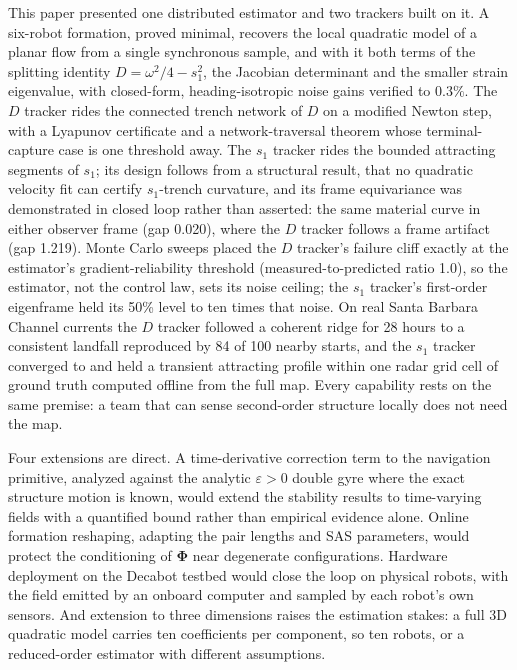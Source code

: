 \documentclass[lettersize,journal]{IEEEtran}
\begin{document}
This paper presented one distributed estimator and two trackers built
on it. A six-robot formation, proved minimal, recovers the local
quadratic model of a planar flow from a single synchronous sample, and
with it both terms of the splitting identity $D = \omega^2/4 - s_1^2$,
the Jacobian determinant and the smaller strain eigenvalue, with
closed-form, heading-isotropic noise gains verified to $0.3\%$. The
$D$ tracker rides the connected trench network of $D$ on a
modified Newton step, with a Lyapunov certificate and a
network-traversal theorem whose terminal-capture case is one threshold
away. The $s_1$ tracker rides the bounded attracting segments of $s_1$;
its design follows from a structural result, that no quadratic velocity
fit can certify $s_1$-trench curvature, and its frame equivariance was
demonstrated in closed loop rather than asserted: the same material
curve in either observer frame (gap 0.020), where the $D$ tracker
follows a frame artifact (gap 1.219). Monte Carlo sweeps placed the
$D$ tracker's failure cliff exactly at the estimator's
gradient-reliability threshold (measured-to-predicted ratio 1.0), so
the estimator, not the control law, sets its noise ceiling; the $s_1$
tracker's first-order eigenframe held its 50\% level to ten times that
noise. On real Santa
Barbara Channel currents the $D$ tracker followed a coherent
ridge for 28 hours to a consistent landfall reproduced by 84 of 100
nearby starts, and the $s_1$ tracker converged to and held a transient
attracting profile within one radar grid cell of ground truth computed
offline from the full map. Every capability rests on the same premise:
a team that can sense second-order structure locally does not need the
map.

Four extensions are direct. A time-derivative correction term to the
navigation primitive, analyzed against the analytic $\varepsilon > 0$
double gyre where the exact structure motion is known, would extend
the stability results to time-varying fields with a quantified bound
rather than empirical evidence alone. Online formation reshaping,
adapting the pair lengths and SAS parameters, would protect the
conditioning of $\boldsymbol{\Phi}$ near degenerate configurations.
Hardware deployment on the Decabot testbed would close the loop on
physical robots, with the field emitted by an onboard computer and
sampled by each robot's own sensors. And extension to three
dimensions raises the estimation stakes: a full 3D quadratic model
carries ten coefficients per component, so ten robots, or a
reduced-order estimator with different assumptions.
\end{document}
